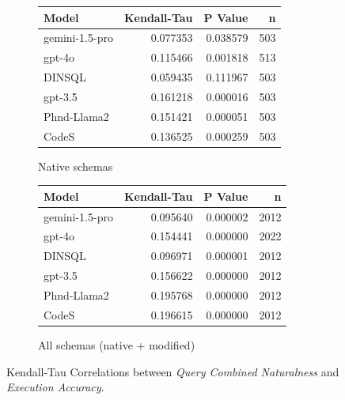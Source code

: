 \begin{figure}
  \centering
  \begin{subfigure}{.5\linewidth}
      \centering
      \begin{tabular}{lrrr}
\toprule
Model & Kendall-Tau & P Value & n \\
\midrule
gemini-1.5-pro & 0.077353 & 0.038579 & 503 \\
gpt-4o & 0.115466 & 0.001818 & 513 \\
DINSQL & 0.059435 & 0.111967 & 503 \\
gpt-3.5 & 0.161218 & 0.000016 & 503 \\
Phnd-Llama2 & 0.151421 & 0.000051 & 503 \\
CodeS & 0.136525 & 0.000259 & 503 \\
\bottomrule
\end{tabular}

      \caption{Native schemas}
      \label{table:executionktaunative}
  \end{subfigure}%
  \begin{subfigure}{.5\linewidth}
      \centering
      \begin{tabular}{lrrr}
\toprule
Model & Kendall-Tau & P Value & n \\
\midrule
gemini-1.5-pro & 0.095640 & 0.000002 & 2012 \\
gpt-4o & 0.154441 & 0.000000 & 2022 \\
DINSQL & 0.096971 & 0.000001 & 2012 \\
gpt-3.5 & 0.156622 & 0.000000 & 2012 \\
Phnd-Llama2 & 0.195768 & 0.000000 & 2012 \\
CodeS & 0.196615 & 0.000000 & 2012 \\
\bottomrule
\end{tabular}

      \caption{All schemas (native + modified)}
      \label{table:executionktauall}
  \end{subfigure}
  \caption{Kendall-Tau Correlations between \emph{Query Combined Naturalness} and \emph{Execution Accuracy}.}
\end{figure}




